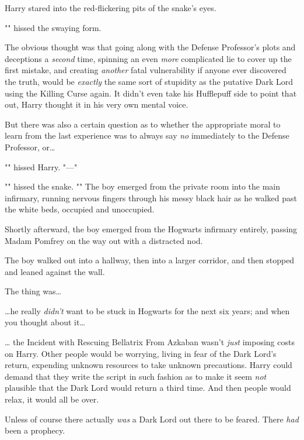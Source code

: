 Harry stared into the red-flickering pits of the snake's eyes.

"" hissed the swaying form.

The obvious thought was that going along with the Defense Professor's plots and 
deceptions a \emph{second} time, spinning an even \emph{more} complicated lie 
to cover up the first mistake, and creating \emph{another} fatal vulnerability 
if anyone ever discovered the truth, would be \emph{exactly} the same sort of 
stupidity as the putative Dark Lord using the Killing Curse again. It didn't 
even take his Hufflepuff side to point that out, Harry thought it in his very 
own mental voice.

But there was also a certain question as to whether the appropriate moral to 
learn from the last experience was to always say \emph{no} immediately to the 
Defense Professor, or{\ldots}

"" hissed Harry. "---"

"" hissed the snake. ""
\sbreak
The boy emerged from the private room into the main infirmary, running nervous 
fingers through his messy black hair as he walked past the white beds, occupied 
and unoccupied.

Shortly afterward, the boy emerged from the Hogwarts infirmary entirely, 
passing Madam Pomfrey on the way out with a distracted nod.

The boy walked out into a hallway, then into a larger corridor, and then 
stopped and leaned against the wall.

The thing was{\ldots}

{\ldots}he really \emph{didn't} want to be stuck in Hogwarts for the next six 
years; and when you thought about it{\ldots}

{\ldots} the Incident with Rescuing Bellatrix From Azkaban wasn't \emph{just} 
imposing costs on Harry. Other people would be worrying, living in fear of the 
Dark Lord's return, expending unknown resources to take unknown precautions. 
Harry could demand that they write the script in such fashion as to make it 
seem \emph{not} plausible that the Dark Lord would return a third time. And 
then people would relax, it would all be over.

Unless of course there actually \emph{was} a Dark Lord out there to be feared. 
There \emph{had} been a prophecy.

